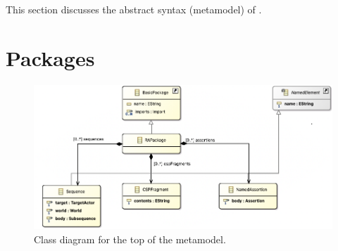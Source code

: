 
\newcommand{\mnamedelement}{\metaref{NamedElement}}
\newcommand{\mrapackage}{\metaref{RAPackage}}
\newcommand{\mrcpackage}{\metaref{RCPackage}}
\newcommand{\mbasicpackage}{\metaref{BasicPackage}}
\newcommand{\msequence}{\metaref{Sequence}}
\newcommand{\msubsequence}{\metaref{Subsequence}}
\newcommand{\msequencestep}{\metaref{SequenceStep}}
\newcommand{\msequencegap}{\metaref{SequenceGap}}
\newcommand{\msequenceaction}{\metaref{SequenceAction}}
\newcommand{\marrowaction}{\metaref{ArrowAction}}
\newcommand{\mloopaction}{\metaref{LoopAction}}
\newcommand{\mfinalaction}{\metaref{FinalAction}}
\newcommand{\mgapmessageset}{\metaref{GapMessageSet}}
\newcommand{\mextensionalgapmessageset}{\metaref{ExtensionalGapMessageSet}}
\newcommand{\muniversegapmessageset}{\metaref{UniverseGapMessageSet}}
\newcommand{\mmessagespec}{\metaref{MessageSpec}}
\newcommand{\marrowmessagespec}{\metaref{ArrowMessageSpec}}
\newcommand{\mgapmessagespec}{\metaref{GapMessageSpec}}
\newcommand{\mmessagetopic}{\metaref{MessageTopic}}
\newcommand{\meventmessagetopic}{\metaref{EventMessageTopic}}
\newcommand{\moperationmessagetopic}{\metaref{OperationMessageTopic}}
\newcommand{\mcspfragment}{\metaref{CSPFragment}}
\newcommand{\mnamedassertion}{\metaref{NamedAssertion}}
\newcommand{\massertion}{\metaref{Assertion}}
\newcommand{\msequenceassertion}{\metaref{SequenceAssertion}}
\newcommand{\msequenceassertiontype}{\metaref{SequenceAssertionType}}
\newcommand{\mcspmodel}{\metaref{CSPModel}}
\newcommand{\mworld}{\metaref{World}}
\newcommand{\mactor}{\metaref{Actor}}
\newcommand{\mtargetactor}{\metaref{TargetActor}}
\newcommand{\mtarget}{\metaref{Target}}
\newcommand{\mrcmodule}{\metaref{RCModule}}
\newcommand{\mrcmoduletarget}{\metaref{RCModuleTarget}}
\newcommand{\moverridetarget}{\metaref{OverrideTarget}}

This section discusses the abstract syntax (metamodel) of \langname.


\section{Packages}\label{sec:metamodel-top}

\begin{figure}
	\centering
	\includegraphics[width=.8\textwidth]{diagrams/top.png}
	\caption{Class diagram for the top of the \langname{} metamodel.}
	\label{fig:metamodel-top}
\end{figure}

